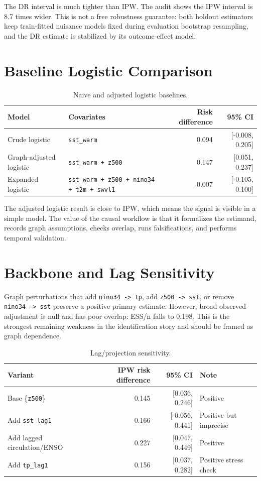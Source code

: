 \documentclass[11pt]{article}
\begin{document}
The DR interval is much tighter than IPW. The audit shows the IPW interval is
8.7 times wider. This is not a free robustness guarantee: both holdout
estimators keep train-fitted nuisance models fixed during evaluation bootstrap
resampling, and the DR estimate is stabilized by its outcome-effect model.

\section{Baseline Logistic Comparison}

\begin{table}[h]
\centering
\caption{Naive and adjusted logistic baselines.}
\begin{tabular}{llrr}
\toprule
Model & Covariates & Risk difference & 95\% CI \\
\midrule
Crude logistic & \texttt{sst\_warm} & 0.094 & [-0.008, 0.205] \\
Graph-adjusted logistic & \texttt{sst\_warm + z500} & 0.147 & [0.051, 0.237] \\
Expanded logistic & \texttt{sst\_warm + z500 + nino34 + t2m + swvl1} & -0.007 & [-0.105, 0.100] \\
\bottomrule
\end{tabular}
\end{table}

The adjusted logistic result is close to IPW, which means the signal is visible
in a simple model. The value of the causal workflow is that it formalizes the
estimand, records graph assumptions, checks overlap, runs falsifications, and
performs temporal validation.

\section{Backbone and Lag Sensitivity}

Graph perturbations that add \texttt{nino34 -> tp}, add \texttt{z500 -> sst}, or
remove \texttt{nino34 -> sst} preserve a positive primary estimate. However,
broad observed adjustment is null and has poor overlap: ESS/n falls to 0.198.
This is the strongest remaining weakness in the identification story and should
be framed as graph dependence.

\begin{table}[h]
\centering
\caption{Lag/projection sensitivity.}
\begin{tabular}{lrrl}
\toprule
Variant & IPW risk difference & 95\% CI & Note \\
\midrule
Base \{\texttt{z500}\} & 0.145 & [0.036, 0.246] & Positive \\
Add \texttt{sst\_lag1} & 0.166 & [-0.056, 0.441] & Positive but imprecise \\
Add lagged circulation/ENSO & 0.227 & [0.047, 0.449] & Positive \\
Add \texttt{tp\_lag1} & 0.156 & [0.037, 0.282] & Positive stress check \\
\bottomrule
\end{tabular}
\end{table}
\end{document}
